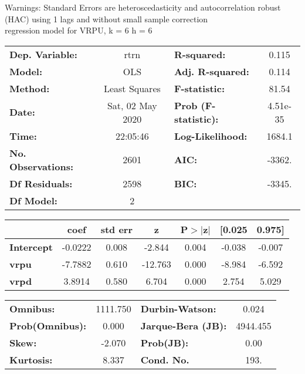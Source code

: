 Warnings: \newline
 [1] Standard Errors are heteroscedasticity and autocorrelation robust (HAC) using 1 lags and without small sample correction\\ 

regression model for VRPU, k = 6 h = 6\begin{center}
\begin{tabular}{lclc}
\toprule
\textbf{Dep. Variable:}    &       rtrn       & \textbf{  R-squared:         } &     0.115   \\
\textbf{Model:}            &       OLS        & \textbf{  Adj. R-squared:    } &     0.114   \\
\textbf{Method:}           &  Least Squares   & \textbf{  F-statistic:       } &     81.54   \\
\textbf{Date:}             & Sat, 02 May 2020 & \textbf{  Prob (F-statistic):} &  4.51e-35   \\
\textbf{Time:}             &     22:05:46     & \textbf{  Log-Likelihood:    } &    1684.1   \\
\textbf{No. Observations:} &        2601      & \textbf{  AIC:               } &    -3362.   \\
\textbf{Df Residuals:}     &        2598      & \textbf{  BIC:               } &    -3345.   \\
\textbf{Df Model:}         &           2      & \textbf{                     } &             \\
\bottomrule
\end{tabular}
\begin{tabular}{lcccccc}
                   & \textbf{coef} & \textbf{std err} & \textbf{z} & \textbf{P$> |$z$|$} & \textbf{[0.025} & \textbf{0.975]}  \\
\midrule
\textbf{Intercept} &      -0.0222  &        0.008     &    -2.844  &         0.004        &       -0.038    &       -0.007     \\
\textbf{vrpu}      &      -7.7882  &        0.610     &   -12.763  &         0.000        &       -8.984    &       -6.592     \\
\textbf{vrpd}      &       3.8914  &        0.580     &     6.704  &         0.000        &        2.754    &        5.029     \\
\bottomrule
\end{tabular}
\begin{tabular}{lclc}
\textbf{Omnibus:}       & 1111.750 & \textbf{  Durbin-Watson:     } &    0.024  \\
\textbf{Prob(Omnibus):} &   0.000  & \textbf{  Jarque-Bera (JB):  } & 4944.455  \\
\textbf{Skew:}          &  -2.070  & \textbf{  Prob(JB):          } &     0.00  \\
\textbf{Kurtosis:}      &   8.337  & \textbf{  Cond. No.          } &     193.  \\
\bottomrule
\end{tabular}
\end{center}

